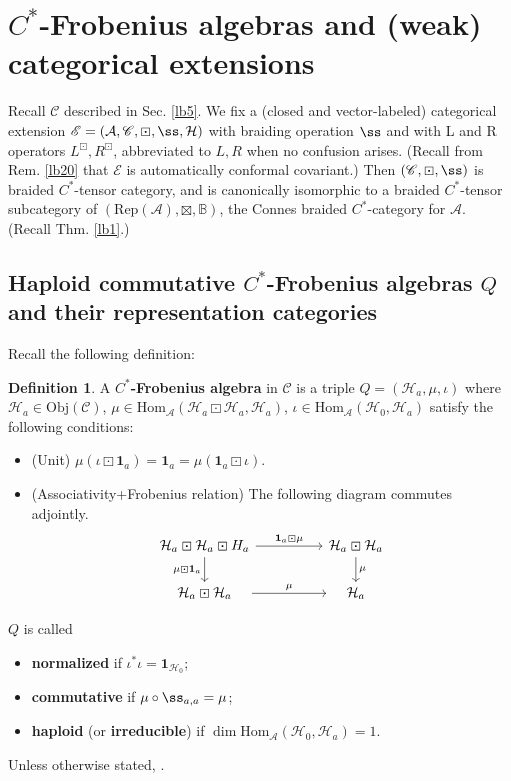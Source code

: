 \documentclass[11pt,b5paper,notitlepage]{article}
\theoremstyle{definition}
\newtheorem{df}{Definition}[section]
\theoremstyle{plain}
\newcommand{\mc}{\mathcal}
\newcommand{\idt}{\mathbf{1}}
\newcommand{\Hom}{\mathrm{Hom}}
\newcommand{\Rep}{\mathrm{Rep}}
\newcommand{\scr}{\mathscr}
\newcommand{\mbb}{\mathbb}
\newcommand{\Obj}{\mathrm{Obj}}
\numberwithin{equation}{section}
\begin{document}
\section{$C^*$-Frobenius algebras and (weak) categorical extensions}\label{lb24}


Recall $\scr C$ described in Sec. \ref{lb5}. We fix a (closed and vector-labeled) categorical extension $\scr E=(\mc A,\scr C,\boxdot,\ss,\mc H)$ with braiding operation $\ss$ and with L and R operators $L^\boxdot,R^\boxdot$, abbreviated to $L,R$ when no confusion arises. (Recall from Rem. \ref{lb20} that $\scr E$ is automatically conformal covariant.) Then $(\scr C,\boxdot,\ss)$ is braided $C^*$-tensor category, and is canonically isomorphic to a braided $C^*$-tensor subcategory of $(\Rep(\mc A),\boxtimes,\mbb B)$, the Connes braided $C^*$-category for $\mc A$. (Recall Thm. \ref{lb1}.)



\subsection{Haploid commutative $C^*$-Frobenius algebras $Q$ and their representation categories}\label{lb106}

Recall the following definition: 

\begin{df}
A \textbf{$C^*$-Frobenius algebra} in $\scr C$ is a triple $Q=(\mc H_a,\mu,\iota)$ where $\mc H_a\in\Obj(\scr C)$, $\mu\in\Hom_{\mc A}(\mc H_a\boxdot\mc H_a,\mc H_a)$, $\iota\in\Hom_{\mc A}(\mc H_0,\mc H_a)$ satisfy the following conditions:
	\begin{itemize}
		\item (Unit) $\mu(\iota\boxdot\idt_a)=\idt_a=\mu(\idt_a\boxdot\iota)$.
		\item (Associativity+Frobenius relation) The following diagram commutes adjointly.
		\begin{equation}
			\begin{tikzcd}
				\mc H_a\boxdot\mc H_a\boxdot H_a\arrow[rr,"\idt_a\boxdot\mu"]\arrow[d,"\mu\boxdot\idt_a"'] && \mc H_a\boxdot\mc H_a\arrow[d,"\mu"]\\
				\quad\mc H_a\boxdot\mc H_a\quad\arrow[rr,"\mu"] && \quad\mc H_a\quad
			\end{tikzcd}	
		\end{equation} 
\end{itemize}
$Q$ is called
\begin{itemize}
\item \textbf{normalized} if $\iota^*\iota=\idt_{\mc H_0}$;
\item \textbf{commutative} if $\mu\circ\ss_{a,a}=\mu$;
\item \textbf{haploid} (or \textbf{irreducible}) if $\dim\Hom_{\mc A}(\mc H_0,\mc H_a)=1$. 
\end{itemize}
Unless otherwise stated, .
\end{df}
\end{document}
